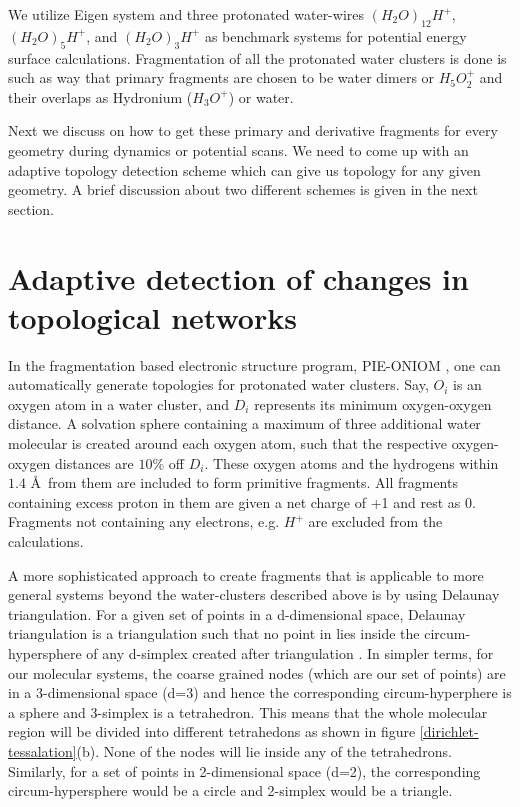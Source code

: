 We utilize Eigen system and three protonated water-wires $(H_2O)_{12}H^+$, $(H_2O)_{5}H^+$, and
$(H_2O)_{3}H^+$ as benchmark systems for potential energy surface calculations.
Fragmentation of all the protonated water clusters is done is such as way that primary fragments are
chosen to be water dimers or $H_5O_2^+$ and their overlaps as Hydronium ($H_3O^+$) or water.

Next we discuss on how to get these primary and derivative fragments for every geometry
during dynamics or potential scans. We need to come up with an adaptive topology detection scheme
which can give us topology for any given geometry. A brief discussion about two different schemes
is given in the next section.

\section{Adaptive detection of changes in topological networks}
{\label{autosubDiscussion}}
In the fragmentation based electronic structure program, PIE-ONIOM
\cite{fragAIMD}, one can automatically generate topologies for
protonated water clusters. Say, $O_{i}$ is an oxygen atom in a water cluster,
and $D_{i}$ represents its minimum oxygen-oxygen distance. A solvation
sphere containing a maximum of three additional water molecular is created
around each oxygen atom, such that the respective oxygen-oxygen distances
are $10\%$ off $D_{i}$. These oxygen atoms and the hydrogens within $1.4$
\AA ~from them are included to form primitive fragments. All fragments
containing excess proton in them are given a net charge of +1 and rest as
0. Fragments not containing any electrons, e.g. $H^{+}$ are excluded from
the calculations.

A more sophisticated approach to create fragments that is applicable to more
general systems beyond the water-clusters described above is by using Delaunay
triangulation. For a given set of points in a d-dimensional space, Delaunay
triangulation is a triangulation such that no point in lies inside the
circum-hypersphere of any d-simplex created after triangulation
\cite{delaunayOriginalPaper, cgalLibrary}. In simpler terms, for our molecular
systems, the coarse grained nodes (which are our set of points) are in a
3-dimensional space (d=3) and hence the corresponding circum-hyperphere is a
sphere and 3-simplex is a tetrahedron. This means that the whole molecular region
will be divided into different tetrahedons as shown in figure
\ref{dirichlet-tessalation}(b). None of the nodes will lie inside any of the
tetrahedrons. Similarly, for a set of points in 2-dimensional space (d=2), the
corresponding circum-hypersphere would be a circle and 2-simplex would be a
triangle.

